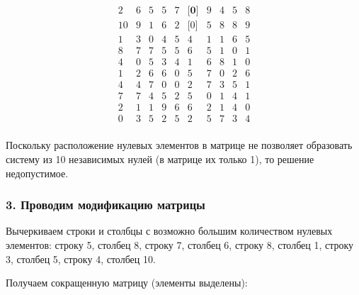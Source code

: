 \documentclass[17pt]{extarticle}
\begin{document}
\[
    \begin{array}{*{10}{c}}
        2  & 6 & 5 & 5 & 7 & \textbf{[0]} & 9 & 4 & 5 & 8 \\
        10 & 9 & 1 & 6 & 2 & \text{[0]}   & 5 & 8 & 8 & 9 \\
        1  & 3 & 0 & 4 & 5 & 4            & 1 & 1 & 6 & 5 \\
        8  & 7 & 7 & 5 & 5 & 6            & 5 & 1 & 0 & 1 \\
        4  & 0 & 5 & 3 & 4 & 1            & 6 & 8 & 1 & 0 \\
        1  & 2 & 6 & 6 & 0 & 5            & 7 & 0 & 2 & 6 \\
        4  & 4 & 7 & 0 & 0 & 2            & 7 & 3 & 5 & 1 \\
        7  & 7 & 4 & 5 & 2 & 5            & 0 & 1 & 4 & 1 \\
        2  & 1 & 1 & 9 & 6 & 6            & 2 & 1 & 4 & 0 \\
        0  & 3 & 5 & 2 & 5 & 2            & 5 & 7 & 3 & 4 \\
    \end{array}
\]

Поскольку расположение нулевых элементов в матрице не позволяет образовать систему из 10 независимых нулей (в матрице их только 1), то решение недопустимое.

\subsubsection*{3. Проводим модификацию матрицы}

Вычеркиваем строки и столбцы с возможно большим количеством нулевых элементов: строку 5, столбец 8, строку 7, столбец 6, строку 8, столбец 1, строку 3, столбец 5, строку 4, столбец 10.

Получаем сокращенную матрицу (элементы выделены):
\end{document}
